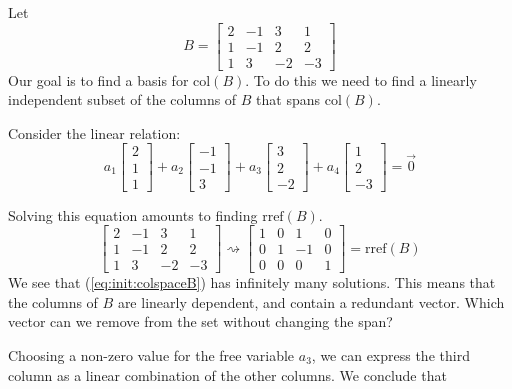 \documentclass{ximera}
\begin{document}
\begin{exploration}\label{init:colspace}
Let
$$B=\begin{bmatrix}2&-1&3&1\\1&-1&2&2\\1&3&-2&-3\end{bmatrix}$$
Our goal is to find a basis for $\mbox{col}(B)$.  To do this we need to find a linearly independent subset of the columns of $B$ that spans $\mbox{col}(B)$.

Consider the linear relation:
\begin{equation}\label{eq:init:colspaceB} a_1\begin{bmatrix}2\\1\\1\end{bmatrix}+a_2\begin{bmatrix}-1\\-1\\3\end{bmatrix}+a_3\begin{bmatrix}3\\2\\-2\end{bmatrix}+a_4\begin{bmatrix}1\\2\\-3\end{bmatrix}=\vec{0}\end{equation}

Solving this equation amounts to finding $\mbox{rref}(B)$.
$$\begin{bmatrix}2&-1&3&1\\1&-1&2&2\\1&3&-2&-3\end{bmatrix}\rightsquigarrow\begin{bmatrix}1&0&1&0\\0&1&-1&0\\0&0&0&1\end{bmatrix}=\mbox{rref}(B)$$
We see that (\ref{eq:init:colspaceB}) has infinitely many solutions.  This means that the columns of $B$ are linearly dependent, and contain a redundant vector.  Which vector can we remove from the set without changing the span?

Choosing a non-zero value for the free variable $a_3$, we can express the third column as a linear combination of the other columns.  We conclude that 


\end{exploration}
\end{document}
